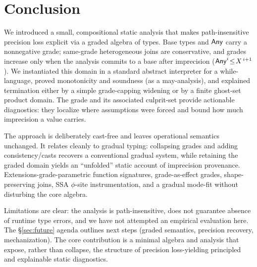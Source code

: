 \section{Conclusion}
\label{sec:conclusion}

We introduced a small, compositional static analysis that makes path-insensitive precision loss explicit via a graded algebra of types. Base types and $\mathsf{Any}$ carry a nonnegative grade; same-grade heterogeneous joins are conservative, and grades increase only when the analysis commits to a base after imprecision ($\mathsf{Any}^{i}\!\le\!X^{\,i+1}$). We instantiated this domain in a standard abstract interpreter for a \textsf{while}-language, proved monotonicity and soundness (as a may-analysis), and explained termination either by a simple grade-capping widening or by a finite ghost-set product domain. The grade and its associated culprit-set provide actionable diagnostics: they localize where assumptions were forced and bound how much imprecision a value carries.

The approach is deliberately cast-free and leaves operational semantics unchanged. It relates cleanly to gradual typing: collapsing grades and adding consistency/casts recovers a conventional gradual system, while retaining the graded domain yields an ``unfolded'' static account of imprecision provenance. Extensions-grade-parametric function signatures, grade-as-effect grades, shape-preserving joins, SSA $\phi$-site instrumentation, and a gradual mode-fit without disturbing the core algebra.

Limitations are clear: the analysis is path-insensitive, does not guarantee absence of runtime type errors, and we have not attempted an empirical evaluation here. The \S\ref{sec:future} agenda outlines next steps (graded semantics, precision recovery, mechanization). The core contribution is a minimal algebra and analysis that expose, rather than collapse, the structure of precision loss-yielding principled and explainable static diagnostics.
